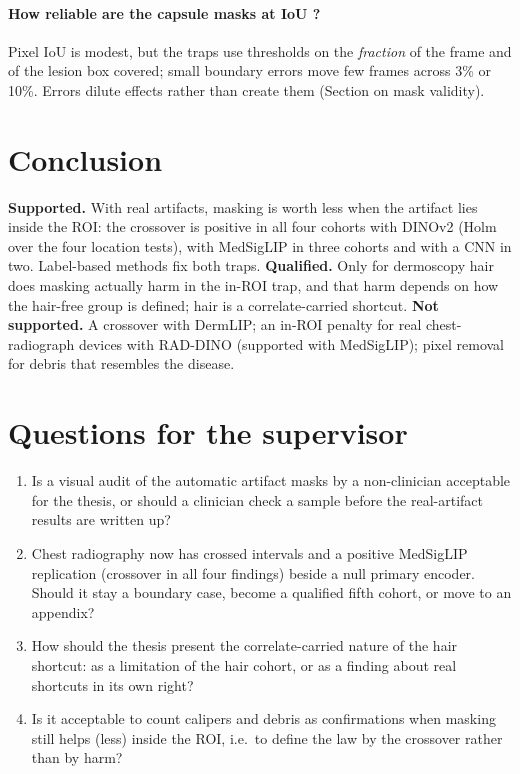 \paragraph{How reliable are the capsule masks at IoU \sThreeProbeIoU?} Pixel IoU is modest, but the traps use
thresholds on the \emph{fraction} of the frame and of the lesion box covered; small boundary errors move few frames
across 3\% or 10\%. Errors dilute effects rather than create them (Section on mask validity).

\section{Conclusion}
\textbf{Supported.} With real artifacts, masking is worth less when the artifact lies inside the ROI: the crossover is
positive in all four cohorts with DINOv2 (Holm over the four location tests), with MedSigLIP in three cohorts and with a
CNN in two. Label-based methods fix both traps. \textbf{Qualified.} Only for dermoscopy hair does masking actually harm
in the in-ROI trap, and that harm depends on how the hair-free group is defined; hair is a correlate-carried shortcut.
\textbf{Not supported.} A crossover with DermLIP; an in-ROI penalty for real chest-radiograph devices with RAD-DINO
(supported with MedSigLIP); pixel removal for
debris that resembles the disease.

\section{Questions for the supervisor}
\begin{enumerate}\itemsep1pt
\item Is a visual audit of the automatic artifact masks by a non-clinician acceptable for the thesis, or should a
clinician check a sample before the real-artifact results are written up?
\item Chest radiography now has crossed intervals and a positive MedSigLIP replication (crossover in all four findings)
beside a null primary encoder. Should it stay a boundary case, become a qualified fifth cohort, or move to an appendix?
\item How should the thesis present the correlate-carried nature of the hair shortcut: as a limitation of the hair
cohort, or as a finding about real shortcuts in its own right?
\item Is it acceptable to count calipers and debris as confirmations when masking still helps (less) inside the ROI,
i.e.\ to define the law by the crossover rather than by harm?
\end{enumerate}




